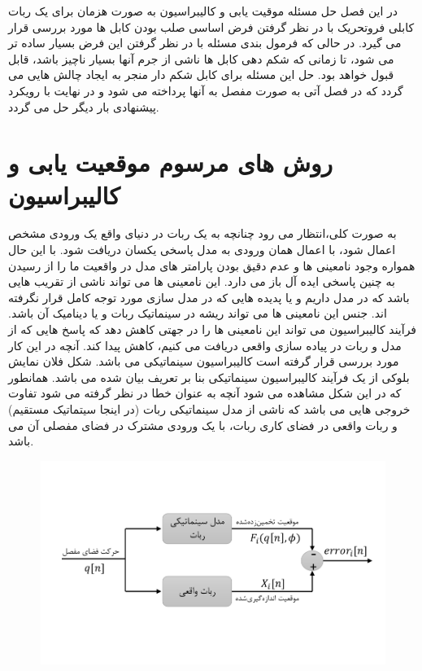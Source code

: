 در این فصل حل مسئله موقیت یابی و کالیبراسیون به صورت هزمان برای یک ربات کابلی فروتحریک با در نظر گرفتن فرض اساسی صلب بودن کابل ها مورد بررسی قرار می گیرد. در حالی که فرمول بندی مسئله با در نظر گرفتن این فرض بسیار ساده تر می شود، تا زمانی که شکم دهی کابل ها ناشی از جرم آنها بسیار ناچیز باشد، قابل قبول خواهد بود. حل این مسئله برای کابل شکم دار منجر به ایجاد چالش هایی می گردد که در فصل آتی به صورت مفصل به آنها پرداخته می شود و در نهایت با رویکرد پیشنهادی بار دیگر حل می گردد. 

\section{روش های مرسوم موقعیت یابی و کالیبراسیون}
به صورت کلی،انتظار می رود چنانچه به یک ربات در دنیای واقع یک ورودی مشخص اعمال شود، با اعمال همان ورودی به مدل پاسخی یکسان دریافت شود. با این حال همواره وجود نامعینی ها و عدم دقیق بودن پارامتر های مدل در واقعیت ما را از رسیدن به چنین پاسخی ایده آل باز می دارد. این نامعینی ها می تواند ناشی از تقریب هایی باشد که در مدل داریم و یا پدیده هایی که در مدل سازی مورد توجه کامل قرار نگرفته اند. جنس این نامعینی ها می تواند ریشه در سینماتیک ربات و یا دینامیک آن باشد. فرآیند کالیبراسیون می تواند این نامعینی ها را در جهتی کاهش دهد که پاسخ هایی که از مدل و ربات در پیاده سازی واقعی دریافت می کنیم، کاهش پیدا کند. آنچه در این کار مورد بررسی قرار گرفته است کالیبراسیون سینماتیکی می باشد. شکل فلان نمایش بلوکی از یک فرآیند کالیبراسیون سینماتیکی بنا بر تعریف بیان شده می باشد. همانطور که در این شکل مشاهده می شود آنچه به عنوان خطا در نظر گرفته می شود تفاوت خروجی هایی می باشد که ناشی از مدل سینماتیکی ربات (در اینجا سیتماتیک مستقیم) و ربات واقعی در فضای کاری ربات، با یک ورودی مشترک در فضای مفصلی آن می باشد. 

\begin{figure}
	\centering
	\includegraphics[width=0.8\linewidth, trim={0cm 2.2cm 0cm 2.2cm}, clip]{img/kinematic_model_error}
	\caption{}
	\label{fig:kinematicmodelerror}
\end{figure}


